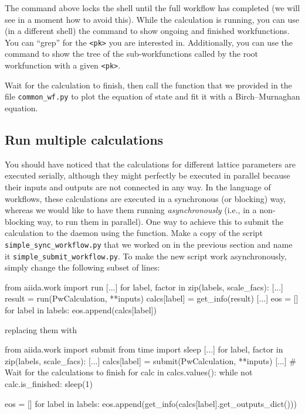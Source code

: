 The command above locks the shell until the full workflow has completed (we will see in a moment how to avoid this).
While the calculation is running, you can use (in a different shell) the command  to show ongoing and finished workfunctions. You can ``grep'' for the \texttt{<pk>} you are interested in. Additionally, you can use the command   to show the tree of the sub-workfunctions called by the root workfunction with a given \texttt{<pk>}.

\begin{tcolorbox}
Wait for the calculation to finish, then call the function  that we provided in the file \texttt{common\_wf.py} to plot the equation of state and fit it with a Birch--Murnaghan equation.
\end{tcolorbox}

\subsection{\label{sec:wf-multiple-calcs}Run multiple calculations}

You should have noticed that the calculations for different lattice parameters are executed serially, although they might perfectly be executed in parallel because their inputs and outputs are not connected in any way.
In the language of workflows, these calculations are executed in a synchronous (or blocking) way, whereas we would like to have them running \emph{asynchronously} (i.e., in a non-blocking way, to run them in parallel). 
One way to achieve this to submit the calculation to the daemon using the  function.
Make a copy of the script \texttt{simple\_sync\_workflow.py} that we worked on in the previous section and name it \texttt{simple\_submit\_workflow.py}.
To make the new script work asynchronously, simply change the following subset of lines:
\begin{pythoncommand}
from aiida.work import run
[...]
for label, factor in zip(labels, scale_facs):
    [...]
    result = run(PwCalculation, **inputs)
    calcs[label] = get_info(result)
[...]
eos = []
for label in labels:
    eos.append(calcs[label])
\end{pythoncommand}
replacing them with
\begin{pythoncommand}
from aiida.work import submit
from time import sleep
[...]
for label, factor in zip(labels, scale_facs):
    [...]
    calcs[label] = submit(PwCalculation, **inputs)
[...]
# Wait for the calculations to finish
for calc in calcs.values():
    while not calc.is_finished:
        sleep(1)

eos = []
for label in labels:
    eos.append(get_info(calcs[label].get_outputs_dict()))
\end{pythoncommand}

